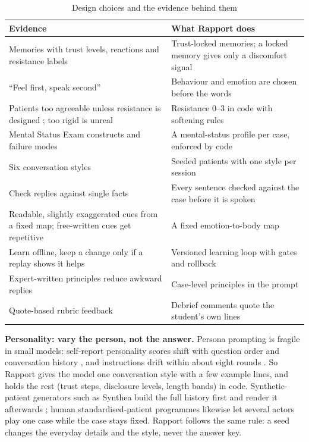 \documentclass[journal]{IEEEtran}
\begin{document}
\begin{table}[t]
\caption{Design choices and the evidence behind them}
\label{p4:tab:built}
\centering
\scriptsize
\begin{tabularx}{\columnwidth}{@{}YY@{}}
\toprule
Evidence & What Rapport does\\
\midrule
Memories with trust levels, reactions and resistance labels \cite{sabour2026patientact} & Trust-locked memories; a locked memory gives
only a discomfort signal\\
``Feel first, speak second'' \cite{sabour2026patientact} & Behaviour and emotion are chosen before the words\\
Patients too agreeable unless resistance is designed \cite{steenstra2025scaffolding,lee2025psyche}; too rigid is unreal
\cite{bodonhelyi2025modeling} & Resistance 0--3 in code with softening rules\\
Mental Status Exam constructs and failure modes \cite{lee2025psyche} & A mental-status profile per case, enforced by code\\
Six conversation styles \cite{wang2024patient} & Seeded patients with one style per session\\
Check replies against single facts \cite{lai2025patientzero} & Every sentence checked against the case before it is spoken\\
Readable, slightly exaggerated cues from a fixed map; free-written cues get repetitive \cite{haut2025ai,bodonhelyi2025modeling} & A fixed
emotion-to-body map\\
Learn offline, keep a change only if a replay shows it helps \cite{du2024llms,li2024agent,agrawal2025gepa} & Versioned learning loop with gates
and rollback\\
Expert-written principles reduce awkward replies \cite{louie2024roleplaydoh} & Case-level principles in the prompt\\
Quote-based rubric feedback \cite{hicke2025medsimai} & Debrief comments quote the student's own lines\\
\bottomrule
\end{tabularx}
\end{table}

\textbf{Personality: vary the person, not the answer.} Persona prompting is fragile in small models: self-report personality scores shift with
question order and conversation history \cite{tosato2025persist}, and instructions drift within about eight rounds \cite{li2024instruction}.
So Rapport gives the model one conversation style with a few example lines, and holds the rest (trust steps, disclosure levels, length bands)
in code. Synthetic-patient generators such as Synthea build the full history first and render it afterwards \cite{walonoski2018synthea}; human
standardised-patient programmes likewise let several actors play one case while the case stays fixed. Rapport follows the same rule: a seed
changes the everyday details and the style, never the answer key.
\end{document}
